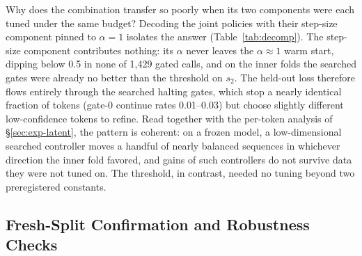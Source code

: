 ﻿\documentclass[11pt]{article}
\begin{document}
Why does the combination transfer so poorly when its two components were each tuned under the same budget? Decoding the joint policies with their step-size component pinned to $\alpha{=}1$ isolates the answer (Table~\ref{tab:decomp}). The step-size component contributes nothing: its $\alpha$ never leaves the $\alpha{\approx}1$ warm start, dipping below 0.5 in none of 1{,}429 gated calls, and on the inner folds the searched gates were already no better than the threshold on $s_2$. The held-out loss therefore flows entirely through the searched halting gates, which stop a nearly identical fraction of tokens (gate-0 continue rates 0.01--0.03) but choose slightly different low-confidence tokens to refine. Read together with the per-token analysis of \S\ref{sec:exp-latent}, the pattern is coherent: on a frozen model, a low-dimensional searched controller moves a handful of nearly balanced sequences in whichever direction the inner fold favored, and gains of such controllers do not survive data they were not tuned on. The threshold, in contrast, needed no tuning beyond two preregistered constants.

\begin{table}[t]
\centering
\footnotesize
\setlength{\tabcolsep}{2.5pt}
\caption{\textbf{Where the joint policy loses.} Held-out fold ($n{=}645$ per seed); J1 is the threshold policy and J4 the jointly tuned policy, with $\Delta$EM in percentage points against each seed's frozen best fixed depth (Table~\ref{tab:confirm}). The last two columns split the J4--J1 gap into the share carried by the searched halting gates and the share carried by the searched step sizes, measured by re-decoding J4 with $\alpha{=}1$; flips count the sequences whose EM changes between J1 and J4, as repair/harm.}
\label{tab:decomp}
\end{table}

\subsection{Fresh-Split Confirmation and Robustness Checks}
\label{sec:exp-fresh}
\end{document}
